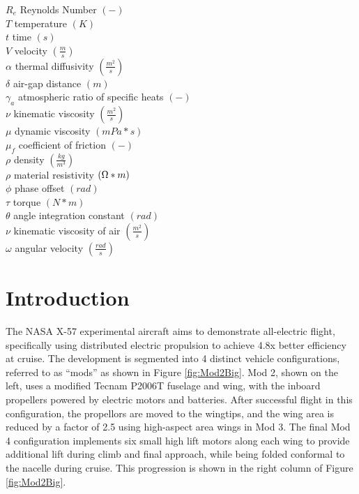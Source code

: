 \documentclass[]{aiaa-tc}%
\begin{document}
\begin{multicols}{2}
\begin{tabbing}
  $R_{e}$ \> Reynolds Number $(-)$\\
  $T$ \> temperature $(K)$\\
  $t$ \> time $(s)$\\
  $V$ \> velocity $(\frac{m}{s})$\\
  $\alpha$ \> thermal diffusivity $(\frac{m^{2}}{s})$\\
  $\delta$ \> air-gap distance $(m)$\\
  $\gamma_a$ \> atmospheric ratio of specific heats $(-)$\\
  $\nu$ \> kinematic viscosity $(\frac{m^2}{s})$\\
  $\mu$ \> dynamic viscosity $(mPa*s)$\\
  $\mu_f$ \> coefficient of friction $(-)$\\
  $\rho$ \> density $(\frac{kg}{m^{3}})$\\
  $\rho$ \> material resistivity $(\ohm*m)$\\
  $\phi$ \> phase offset $(rad)$\\
  $\tau$ \> torque $(N*m)$\\
  $\theta$ \> angle integration constant $(rad)$\\
  $\nu$ \> kinematic viscosity of air $(\frac{m^{2}}{s})$\\
  $\omega$ \> angular velocity $(\frac{rad}{s})$\\

 \end{tabbing}
\end{multicols}
\newpage


\section{Introduction}

The NASA X-57 experimental aircraft aims to demonstrate all-electric flight, specifically using distributed electric propulsion to achieve 4.8x better efficiency at cruise. The development is segmented into 4 distinct vehicle configurations, referred to as ``mods'' as shown in Figure \ref{fig:Mod2Big}. Mod 2, shown on the left, uses a modified Tecnam P2006T fuselage and wing, with the inboard propellers powered by electric motors and batteries. After successful flight in this configuration, the propellors are moved to the wingtips, and the wing area is reduced by a factor of 2.5 using high-aspect area wings in Mod 3. The final Mod 4 configuration implements six small high lift motors along each wing to provide additional lift during climb and final approach, while being folded conformal to the nacelle during cruise. This progression is shown in the right column of Figure \ref{fig:Mod2Big}. \cite{falck_X57}
\cite{Borer_2016}
\end{document}
